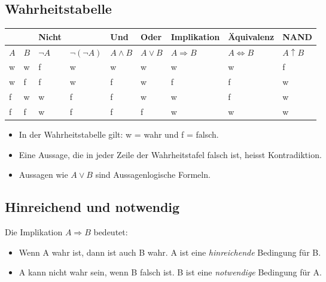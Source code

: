 \subsection{Wahrheitstabelle}
\begin{tabular}{|l|l||l|l|l|l|l|l|l|}
  \hline
  & & Nicht &  & Und & Oder & Implikation & Äquivalenz & NAND \\
  \hline
  $A$ & $B$ & $\neg A$ & $\neg (\neg A)$ & $A \wedge B$ & $A \vee B$ & $A \Rightarrow B$ & $A \Leftrightarrow B$ & $A \uparrow B$ \\
  \hline
  \hline
  w & w & f & w & w & w & w  & w  & f \\
  w & f & f & w & f & w & f  & f  & w \\
  f & w & w & f & f & w & w  & f  & w \\
  f & f & w & f & f & f & w  & w  & w \\
  \hline
\end{tabular}
\begin{itemize}
  \item In der Wahrheitstabelle gilt: w = wahr und f = falsch.
  \item Eine Aussage, die in jeder Zeile der Wahrheitstafel falsch ist, heisst Kontradiktion.
  \item Aussagen wie $A \vee B$ sind Aussagenlogische Formeln.
\end{itemize}

\subsection{Hinreichend und notwendig}
Die Implikation $A \Rightarrow B$ bedeutet:
\begin{itemize}
  \item Wenn A wahr ist, dann ist auch B wahr. A ist eine \emph{hinreichende} Bedingung für B.
  \item A kann nicht wahr sein, wenn B falsch ist. B ist eine \emph{notwendige} Bedingung für A.
\end{itemize}

